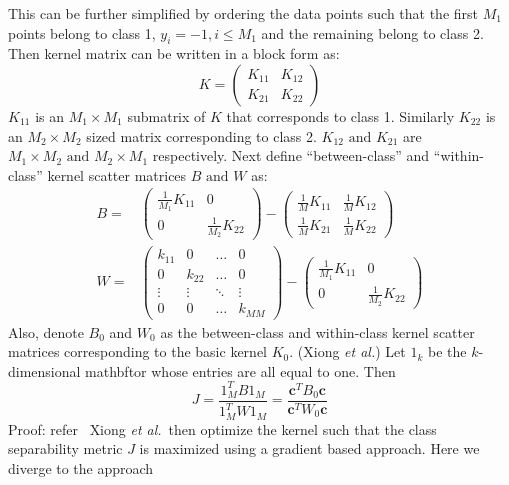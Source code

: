 \documentclass[11pt]{article}
\newcommand{\etal}{{\em et al.}}
\begin{document}
\par
This can be further simplified by ordering the data points such that the first
$M_1$ points belong to class 1, $y_i=-1,i\le M_1$ and the remaining belong to
class 2. Then kernel matrix can be written in a block form as:
\[K=\begin{pmatrix}K_{11}&K_{12}\\K_{21}&K_{22}\end{pmatrix}\]
$K_{11}$ is an $M_1\times M_1$ submatrix of $K$ that corresponds to class 1.
Similarly $K_{22}$ is an $M_2\times M_2$ sized matrix corresponding to class 2.
$K_{12}\text{ and }K_{21}$ are $M_1\times M_2\text{ and }M_2\times M_1$
respectively. Next define ``between-class'' and ``within-class'' kernel scatter
matrices $B\text{ and }W$ as:
\begin{align}
    \label{eq:B}B=&\begin{pmatrix}
        \frac{1}{M_1}K_{11}&0\\
        0&\frac{1}{M_2}K_{22}
        \end{pmatrix}-\begin{pmatrix}
            \frac{1}{M}K_{11}&\frac{1}{M}K_{12}\\
            \frac{1}{M}K_{21}&\frac{1}{M}K_{22}
    \end{pmatrix}\\
    \label{eq:W}W=&\begin{pmatrix}
        k_{11} & 0 & \dots & 0\\
        0 & k_{22} & \dots & 0\\
        \vdots & \vdots & \ddots & \vdots\\
        0 & 0 & \dots & k_{MM}
        \end{pmatrix}-\begin{pmatrix}\frac{1}{M_1}K_{11}&0\\0&\frac{1}{M_2}K_{22}\end{pmatrix}
\end{align}
Also, denote $B_0$ and $W_0$ as the between-class and within-class kernel
scatter matrices corresponding to the basic kernel $K_0$.
{\theorem (Xiong \etal) Let $1_k$ be the $k$-dimensional mathbftor whose
entries are all equal to one. Then
\begin{equation}
    \label{eq:gep}
    J=\frac{1_M^TB1_M}{1_M^TW1_M}=\frac{\mathbf{c}^TB_0\mathbf{c}}{\mathbf{c}^TW_0\mathbf{c}}
\end{equation}
Proof: refer~\cite{xiong}
}
Xiong \etal\ then optimize the kernel such that the class separability metric $J$
is maximized using a gradient based approach. Here we diverge to the approach
\end{document}
